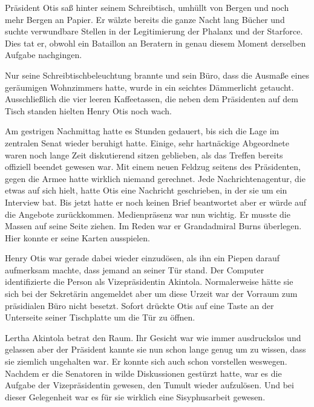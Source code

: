 Präsident Otis saß hinter seinem Schreibtisch, umhüllt von Bergen und noch mehr Bergen an Papier. Er wälzte bereits die ganze Nacht lang Bücher und suchte verwundbare Stellen in der Legitimierung der Phalanx und der Starforce. Dies tat er, obwohl ein Bataillon an Beratern in genau diesem Moment derselben Aufgabe nachgingen.

\par

Nur seine Schreibtischbeleuchtung brannte und sein Büro, dass die Ausmaße eines geräumigen Wohnzimmers hatte, wurde in ein seichtes Dämmerlicht getaucht. Ausschließlich die vier leeren Kaffeetassen, die neben dem Präsidenten auf dem Tisch standen hielten Henry Otis noch wach.

\par

Am gestrigen Nachmittag hatte es Stunden gedauert, bis sich die Lage im zentralen Senat wieder beruhigt hatte. Einige, sehr hartnäckige Abgeordnete waren noch lange Zeit diskutierend sitzen geblieben, als das Treffen bereits offiziell beendet gewesen war. Mit einem neuen Feldzug seitens des Präsidenten, gegen die Armee hatte wirklich niemand gerechnet. Jede Nachrichtenagentur, die etwas auf sich hielt, hatte Otis eine Nachricht geschrieben, in der sie um ein Interview bat. Bis jetzt hatte er noch keinen Brief beantwortet aber er würde auf die Angebote zurückkommen. Medienpräsenz war nun wichtig. Er musste die Massen auf seine Seite ziehen. Im Reden war er Grandadmiral Burns überlegen. Hier konnte er seine Karten ausspielen.

\par

Henry Otis war gerade dabei wieder einzudösen, als ihn ein Piepen darauf aufmerksam machte, dass jemand an seiner Tür stand. Der Computer identifizierte die Person als Vizepräsidentin Akintola. Normalerweise hätte sie sich bei der Sekretärin angemeldet aber um diese Urzeit war der Vorraum zum präsidialen Büro nicht besetzt. Sofort drückte Otis auf eine Taste an der Unterseite seiner Tischplatte um die Tür zu öffnen.

\par

Lertha Akintola betrat den Raum. Ihr Gesicht war wie immer ausdruckslos und gelassen aber der Präsident kannte sie nun schon lange genug um zu wissen, dass sie ziemlich ungehalten war. Er konnte sich auch schon vorstellen weswegen. Nachdem er die Senatoren in wilde Diskussionen gestürzt hatte, war es die Aufgabe der Vizepräsidentin gewesen, den Tumult wieder aufzulösen. Und bei dieser Gelegenheit war es für sie wirklich eine Sisyphusarbeit gewesen.

